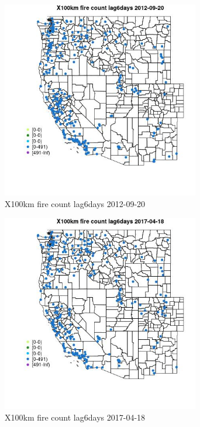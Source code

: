 \begin{figure} 
\centering  
\includegraphics[width=0.77\textwidth]{Code_Outputs/Report_ML_input_PM25_Step4_part_e_de_duplicated_aves_compiled_2019-05-14wNAs_MapObsX100km_fire_count_lag6days2012-09-20.jpg} 
\caption{\label{fig:Report_ML_input_PM25_Step4_part_e_de_duplicated_aves_compiled_2019-05-14wNAsMapObsX100km_fire_count_lag6days2012-09-20}X100km fire count lag6days 2012-09-20} 
\end{figure} 
 

\begin{figure} 
\centering  
\includegraphics[width=0.77\textwidth]{Code_Outputs/Report_ML_input_PM25_Step4_part_e_de_duplicated_aves_compiled_2019-05-14wNAs_MapObsX100km_fire_count_lag6days2017-04-18.jpg} 
\caption{\label{fig:Report_ML_input_PM25_Step4_part_e_de_duplicated_aves_compiled_2019-05-14wNAsMapObsX100km_fire_count_lag6days2017-04-18}X100km fire count lag6days 2017-04-18} 
\end{figure} 
 

